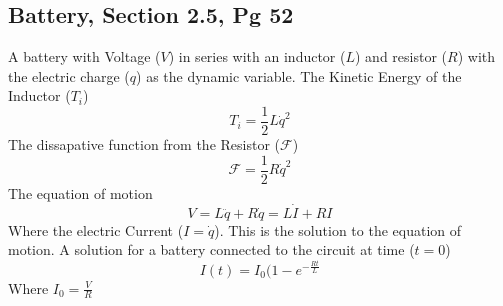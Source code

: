 \documentclass[12pt]{article}
\begin{document}
    \subsection{Battery, Section 2.5, Pg 52}
    A battery with Voltage ($V$) in series with an inductor ($L$) and resistor ($R$) with the electric charge ($q$) as the dynamic variable. 
    The Kinetic Energy of the Inductor ($T_i$)
    \begin{equation}
        T_i = \frac{1}{2} L \dot{q}^2
    \end{equation}
    The dissapative function from the Resistor ($\mathcal{F}$)
    \begin{equation}
        \mathcal{F} = \frac{1}{2} R \dot{q}^2
    \end{equation}
    The equation of motion
    \begin{equation}
        V = L \ddot{q} + R \dot{q} = L \dot{I} + R I
    \end{equation}
    Where the electric Current ($I = \dot{q}$). 
    \newline This is the solution to the equation of motion.
    A solution for a battery connected to the circuit at time ($t=0$)
    \begin{equation}
        I(t) = I_0 (1 - e^{-\frac{R t}{L}}
    \end{equation}
    Where $I_0 = \frac{V}{R}$ %
\end{document}

